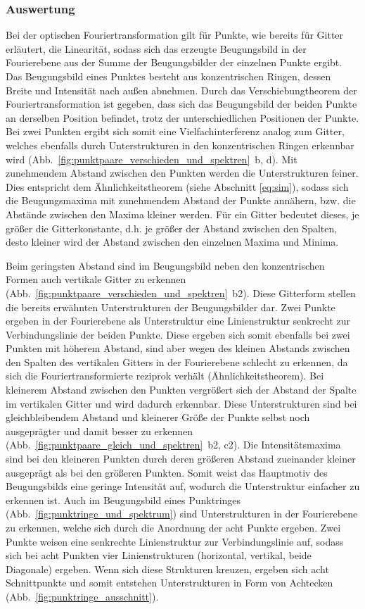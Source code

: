 \subsubsection*{Auswertung}

Bei der optischen Fouriertransformation gilt für Punkte, wie bereits für Gitter erläutert, die Linearität, sodass sich das erzeugte Beugungsbild in der Fourierebene aus der Summe der Beugungsbilder der einzelnen Punkte ergibt. Das Beugungsbild eines Punktes besteht aus konzentrischen Ringen, dessen Breite und Intensität nach außen abnehmen. Durch das Verschiebungtheorem der Fouriertransformation ist gegeben, dass sich das Beugungsbild der beiden Punkte an derselben Position befindet, trotz der unterschiedlichen Positionen der Punkte. Bei zwei Punkten ergibt sich somit eine Vielfachinterferenz analog zum Gitter, welches ebenfalls durch Unterstrukturen in den konzentrischen Ringen erkennbar wird (Abb.~\ref{fig:punktpaare_verschieden_und_spektren}~b, d). Mit zunehmendem Abstand zwischen den Punkten werden die Unterstrukturen feiner. Dies entspricht dem Ähnlichkeitstheorem (siehe Abschnitt \ref{eq:sim}), sodass sich die Beugungsmaxima mit zunehmendem Abstand der Punkte annähern, bzw. die Abstände zwischen den Maxima kleiner werden. Für ein Gitter bedeutet dieses, je größer die Gitterkonstante, d.h. je größer der Abstand zwischen den Spalten, desto kleiner wird der Abstand zwischen den einzelnen Maxima und Minima.

Beim geringsten Abstand sind im Beugungsbild neben den konzentrischen Formen auch vertikale Gitter zu erkennen (Abb.~\ref{fig:punktpaare_verschieden_und_spektren}~b2). Diese Gitterform stellen die bereits erwähnten Unterstrukturen der Beugungsbilder dar. Zwei Punkte ergeben in der Fourierebene als
Unterstruktur eine Linienstruktur senkrecht zur Verbindungslinie der beiden Punkte. Diese ergeben sich somit ebenfalls bei zwei Punkten mit höherem Abstand, sind aber wegen des kleinen Abstands zwischen den Spalten des vertikalen Gitters in der Fourierebene schlecht zu erkennen, da sich die Fouriertransformierte reziprok verhält (Ähnlichkeitstheorem). Bei kleinerem Abstand zwischen den Punkten vergrößert sich der Abstand der Spalte im vertikalen Gitter und wird dadurch erkennbar. Diese Unterstrukturen sind bei gleichbleibendem Abstand und kleinerer Größe der Punkte selbst noch ausgeprägter und damit besser zu erkennen (Abb.~\ref{fig:punktpaare_gleich_und_spektren}~b2, c2). Die Intensitätsmaxima sind bei den kleineren Punkten durch deren größeren Abstand zueinander kleiner ausgeprägt als bei den größeren Punkten. Somit weist das Hauptmotiv des Beugungsbilds eine geringe Intensität auf, wodurch die Unterstruktur einfacher zu erkennen
ist.
Auch im Beugungsbild eines Punktringes (Abb.~\ref{fig:punktringe_und_spektrum}) sind Unterstrukturen in der Fourierebene zu erkennen, welche sich durch die Anordnung der acht Punkte ergeben. Zwei Punkte weisen eine senkrechte Linienstruktur zur Verbindungslinie auf, sodass sich bei acht Punkten vier Linienstrukturen (horizontal, vertikal, beide Diagonale) ergeben. Wenn sich diese Strukturen kreuzen, ergeben sich acht Schnittpunkte und somit entstehen Unterstrukturen in Form von Achtecken (Abb.~\ref{fig:punktringe_ausschnitt}).

